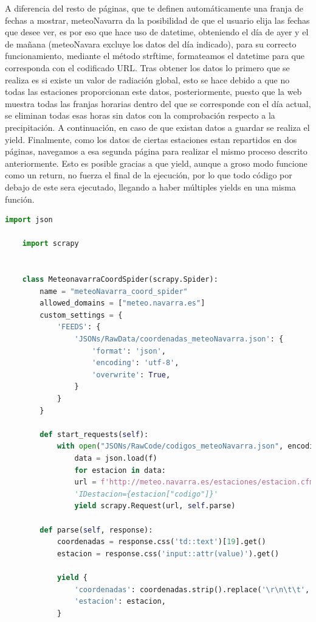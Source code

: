 A diferencia del resto de páginas, que te definen automáticamente una franja de fechas a mostrar, meteoNavarra da la posibilidad de que el usuario elija las fechas que desee ver, es por eso que hace uso de datetime, obteniendo el día de ayer y el de mañana (meteoNavara excluye los datos del día indicado), para su correcto funcionamiento, mediante el método strftime, formateamos el datetime para que corresponda con el codificado URL.\newline
\newline
Tras obtener los datos lo primero que se realiza es si existe un valor de radiación global, esto se hace debido a que no todas las estaciones proporcionan este datos, posteriormente, puesto que la web muestra todas las franjas horarias dentro del  que se corresponde con el día actual, se eliminan todas esas horas sin datos con la comprobación respecto a la precipitación. A continuación, en caso de que existan datos a guardar se realiza el yield.\newline
\newline
Finalmente, como los datos de ciertas estaciones estan repartidos en dos páginas, navegamos a esa segunda página para realizar el mismo proceso descrito anteriormente.\newline
\newline
Esto es posible gracias a que yield, aunque a groso modo funcione como un return, no fuerza el final de la ejecución, por lo que todo código por debajo de este sera ejecutado, llegando a haber múltiples yields en una misma función.

\begin{lstlisting}[language=Python, caption={MeteoNavarra Coordenates Spider}]
	import json
	
	import scrapy
	
	
	class MeteonavarraCoordSpider(scrapy.Spider):
		name = "meteoNavarra_coord_spider"
		allowed_domains = ["meteo.navarra.es"]
		custom_settings = {
			'FEEDS': {
				'JSONs/RawData/coordenadas_meteoNavarra.json': {
					'format': 'json',
					'encoding': 'utf-8',
					'overwrite': True,
				}
			}
		}
		
		def start_requests(self):
			with open("JSONs/RawCode/codigos_meteoNavarra.json", encoding="utf-8") as f:
				data = json.load(f)
				for estacion in data:
				url = f'http://meteo.navarra.es/estaciones/estacion.cfm?'
				'IDestacion={estacion["codigo"]}'
				yield scrapy.Request(url, self.parse)
		
		def parse(self, response):
			coordenadas = response.css('td::text')[19].get()
			estacion = response.css('input::attr(value)').get()
			
			yield {
				'coordenadas': coordenadas.strip().replace('\r\n\t\t', ' ').replace(' (*)', ''),
				'estacion': estacion,
			}
\end{lstlisting}

